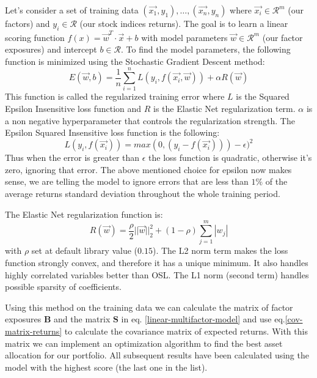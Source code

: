 Let's consider a set of training data $(\vec{x_1}, y_1),\dots,(\vec{x_n}, y_n)$ where $\vec{x_i} \in \mathcal{R}^m$ (our factors) and $y_i \in \mathcal{R}$ (our stock indices returns). The goal is to learn a linear scoring function $f(x) = \vec{w}^{T}\cdot\vec{x} + b$ with model parameters $\vec{w} \in \mathcal{R}^m$ (our factor exposures) and intercept $b \in \mathcal{R}$.
To find the model parameters, the following function is minimized using the Stochastic Gradient Descent method:
\begin{equation}
	E(\vec{w},b) = \frac{1}{n} \sum_{i=1}^n L(y_i, f(\vec{x_i}, \vec{w})) + \alpha R(\vec{w})
	\label{reg-train-error}
\end{equation}
This function is called the regularized training error where $L$ is the Squared Epsilon Insensitive loss function and $R$ is the Elastic Net regularization term. $\alpha$ is a non negative hyperparameter that controls the regularization strength.
The Epsilon Squared Insensitive loss function is the following:
\begin{equation}
	L(y_i, f(\vec{x_i})) = max(0, (y_i - f(\vec{x_i}))) - \epsilon)^2
	\label{sq-ins-epsilon}
\end{equation}
Thus when the error is greater than $\epsilon$ the loss function is quadratic, otherwise it's zero, ignoring that error. The above mentioned choice for epsilon now makes sense, we are telling the model to ignore errors that are less than $1\%$ of the average returns standard deviation throughout the whole training period.

The Elastic Net regularization function is:
\begin{equation}
	R(\vec{w}) = \frac{\rho}{2} ||\vec{w}||_{2}^2 + (1-\rho)\sum_{j = 1}^{m} |w_j|
\end{equation}
with $\rho$ set at default library value ($0.15$). The L2 norm term makes the loss function strongly convex, and therefore it has a unique minimum. It also handles highly correlated variables better than OSL. The L1 norm (second term) handles possible sparsity of coefficients.

Using this method on the training data we can calculate the matrix of factor exposures $\mathbf{B}$ and the matrix $\mathbf{S}$ in eq. \eqref{linear-multifactor-model} and use eq.\eqref{cov-matrix-returns} to calculate the covariance matrix of expected returns. With this matrix we can implement an optimization algorithm to find the best asset allocation for our portfolio.
All subsequent results have been calculated using the model with the highest score (the last one in the list).

